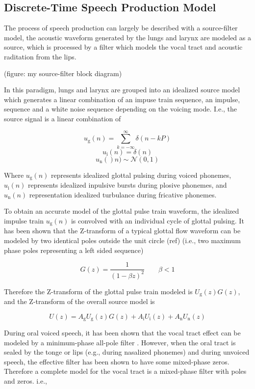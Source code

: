 \subsection{Discrete-Time Speech Production Model} \label{dt_speech_model}

The process of speech production can largely be described with a source-filter model, the acoustic waveform generated by the lungs and larynx are modeled as a source, which is processed by a filter which models the vocal tract and acoustic raditation from the lips.

(figure: my source-filter block diagram)

In this paradigm, lungs and larynx are grouped into an idealized source model which generates a linear combination of an impuse train sequence, an impulse, sequence and a white noise sequence depending on the voicing mode. I.e., the source signal is a linear combination of

\[ u_\mathrm{g}(n)=\sum_{k=-\infty}^{\infty} \delta(n-kP) \]
\[u_\mathrm{i}(n)=\delta(n)\]
\[u_\mathrm{n}()n)\sim\mathcal{N}(0,1)\]

Where $u_\mathrm{g}(n)$ represents idealized glottal pulsing during voiced phonemes, $u_\mathrm{i}(n)$ represents idealized inpulsive bursts during plosive phonemes, and $u_\mathrm{n}(n)$  representation idealized turbulance during fricative phonemes. 

To obtain an accurate model of the glottal pulse train waveform, the idealized impulse train $u_\mathrm{g}(n)$ is convolved with an individual cycle of glottal pulsing. It has been shown that the Z-transform of a typical glottal flow waveform can be modeled by two identical poles outside the unit circle (ref) (i.e., two maximum phase poles representing a left sided sequence)

\begin{equation}
	G(z)=\frac{1}{(1-\beta z)^2} \qquad \beta<1 \label{eq:glottal_pulse_z}
\end{equation}


Therefore the Z-transform of the glottal pulse train modeled is $U_\mathrm{g}(z)G(z)$, and the Z-transform of the overall source model is

\[U(z)=A_\mathrm{g} U_\mathrm{g}(z) G(z)+A_\mathrm{i} U_\mathrm{i}(z)+A_\mathrm{n} U_\mathrm{n}(z)\]

During oral voiced speech, it has been shown that the vocal tract effect can be modeled by a minimum-phase all-pole filter \citep{atal1971speech}. However, when the oral tract is sealed by the tonge or lips (e.g., during nasalized phonemes) and during unvoiced speech, the effective filter has been shown to have some mixed-phase zeros. Therefore a complete model for the vocal tract is a mixed-phase filter with poles and zeros. i.e.,

